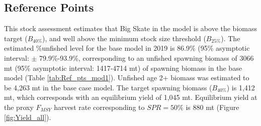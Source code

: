 \documentclass[12pt,]{article}
\begin{document}
\FloatBarrier

\hypertarget{reference-points}{%
\subsection*{Reference Points}\label{reference-points}}

This stock assessment estimates that Big Skate in the model is above the
biomass target (\(B_{40\%}\)), and well above the minimum stock size
threshold (\(B_{25\%}\)). The estimated \%unfished level for the base
model in 2019 is 86.9\% (95\% asymptotic interval: \(\pm\)
79.9\%-93.9\%, corresponding to an unfished spawning biomass of 3066 mt
(95\% asymptotic interval: 1417-4714 mt) of spawning biomass in the base
model (Table \ref{tab:Ref_pts_mod1}). Unfished age 2+ biomass was
estimated to be 4,263 mt in the base case model. The target spawning
biomass (\(B_{40\%}\)) is 1,412 mt, which corresponds with an
equilibrium yield of 1,045 mt. Equilibrium yield at the proxy
\(F_{MSY}\) harvest rate corresponding to \(SPR=50\%\) is 880 mt (Figure
\ref{fig:Yield_all}).

\vspace{.5cm}

\FloatBarrier
\end{document}
